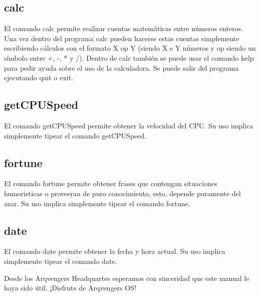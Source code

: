 \documentclass[a4paper,10pt]{article}
\begin{document}
    \subsection{calc}
        El comando calc permite realizar cuentas matemáticas entre números enteros.
        Una vez dentro del programa calc pueden hacerse estas cuentas simplemente escribiendo cálculos con el formato X op Y (siendo X e Y números y op siendo un símbolo entre +, -, * y /).
        Dentro de calc también se puede usar el comando help para pedir ayuda sobre el uso de la calculadora.
        Se puede salir del programa ejecutando quit o exit.
    \subsection{getCPUSpeed}
        El comando getCPUSpeed permite obtener la velocidad del CPU. Su uso implica simplemente tipear el comando getCPUSpeed.
    \subsection{fortune}
        El comando fortune permite obtener frases que contengan situaciones humoristicas o proveeran de puro conocimiento, esto, depende puramente del azar. Su uso implica simplemente tipear el comando fortune.
    \subsection{date}
        El comando date permite obtener la fecha y hora actual. Su uso implica simplemente tipear el comando date.
\vspace{2cm}

Desde los Arqvengers Headquartes esperamos con sinceridad que este manual le haya sido útil. ¡Disfrute de Arqvengers OS!
\end{document}
